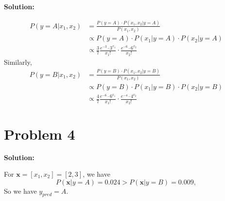 \documentclass[11pt]{article}
\begin{document}
\textbf{Solution:} 

\begin{align*}
P(y = A|x_1, x_2) &= \frac{P(y=A)\cdot P(x_1, x_2|y = A)}{P(x_1, x_2)}\\[0.8em]
& \propto P(y=A)\cdot P(x_1|y = A)\cdot P(x_2|y = A) \\[0.8em]
& \propto \frac{3}{7}\frac{e^{-3}\cdot 3^{x_1}}{x_1!}\cdot \frac{e^{-6}\cdot 6^{x_2}}{x_2!}
\end{align*}
Similarly,
\begin{align*}
P(y = B|x_1, x_2) &= \frac{P(y=B)\cdot P(x_1, x_2|y = B)}{P(x_1, x_2)}\\[0.8em]
& \propto P(y=B)\cdot P(x_1|y = B)\cdot P(x_2|y = B) \\[0.8em]
& \propto \frac{4}{7}\frac{e^{-6}\cdot 6^{x_1}}{x_1!}\cdot \frac{e^{-4}\cdot 4^{x_2}}{x_2!}
\end{align*}


\section*{Problem 4}
\textbf{Solution:} 

For $\bm{x} = [x_1, x_2] = [2,3]$, we have $$P(\bm{x}|y = A) = 0.024 > P(\bm{x}|y = B) = 0.009,$$ So we have $y_{pred} = A$.




\newpage \nocite{*}


\end{document}
